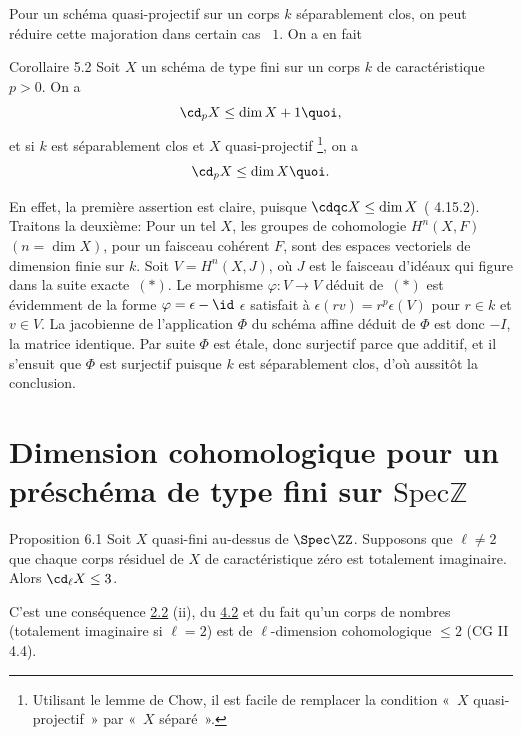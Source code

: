 \documentclass[10pt]{../fichiers-configuration-latex/smfart}
\begin{document}
Pour un schéma quasi-projectif sur un corps $k$ séparablement clos, on
peut réduire cette majoration dans certain cas  $1$. On a en fait

\begin{enonce*}{Corollaire 5.2}
Soit $X$ un schéma de type fini sur un corps $k$ de caractéristique
$p>0$. On a
$$
\cd_pX\leq \dim X+1{\quoi},
$$
et si $k$ est séparablement clos et $X$ quasi-projectif
\footnote[1]{Utilisant le lemme de Chow, il est facile de remplacer
  la condition « $X$ quasi-projectif » par « $X$ séparé ».},
on a
$$
\cd_pX\leq \dim X{\quoi}.
$$
\end{enonce*}

En effet, la première assertion est claire, puisque $\cdqc X\leq \dim
X$ (\cite{6} 4.15.2). Traitons la deuxième: Pour un tel $X$, les groupes de
cohomologie $H^n(X,F)$ $(n=\dim X)$, pour un faisceau cohérent $F$,
sont des espaces vectoriels de dimension finie sur $k$. Soit
$V=H^n(X,J)$, où $J$ est le faisceau d'idéaux qui figure dans la suite
exacte $(\ast)$. Le morphisme $\varphi:V\rightarrow V$ déduit de $(\ast)$
est évidemment de la forme $\varphi=\epsilon-\id$ 
$\epsilon$ satisfait à $\epsilon(rv)=r^p\epsilon(V)$ pour $r\in k$ et
$v\in V$. La jacobienne de l'application $\Phi$ du schéma affine
déduit de $\Phi$ est donc $-I$,  la matrice identique. Par suite
$\Phi$ est étale, donc surjectif parce que additif, et il s'ensuit que
$\Phi$ est surjectif puisque $k$ est séparablement clos, d'où aussitôt
la conclusion.

\section{Dimension cohomologique pour un préschéma de type fini sur $\mathrm{Spec} ℤ$}\pageoriginale

\begin{enonce*}{Proposition 6.1}
Soit $X$ quasi-fini au-dessus de $\Spec \ZZ$. Supposons que
$\ell\neq 2$  que chaque corps résiduel de $X$ de caractéristique
zéro est totalement imaginaire. Alors $\cd_{\ell}X\leq 3$.
\end{enonce*}

C'est une conséquence   \hyperref[X.thm2.2]{2.2} (ii), du  \hyperref[X.cor4.2]{4.2}
et du fait qu'un corps de nombres (totalement imaginaire si $\ell =2$) est
de $\ell$-dimension cohomologique $\leq 2$ (CG II 4.4).
\end{document}
